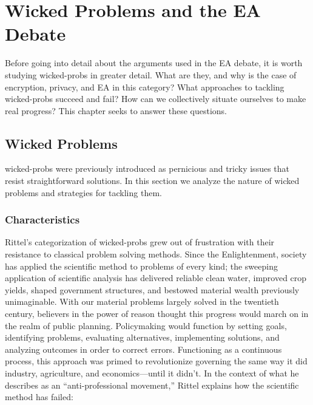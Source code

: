\chapter{Wicked Problems and the EA Debate}
\label{chap-arguments}

Before going into detail about the arguments used in the \ac{EA} debate, it is worth studying \acp{wicked-prob} in
greater detail. What are they, and why is the case of encryption, privacy, and \ac{EA} in this category? What approaches
to tackling \acp{wicked-prob} succeed and fail? How can we collectively situate ourselves to make real progress? This
chapter seeks to answer these questions.


\section{Wicked Problems}

\Acp{wicked-prob} were previously introduced as pernicious and tricky issues that resist straightforward solutions.
In this section we analyze the nature of wicked problems and strategies for tackling them.

\subsection{Characteristics}

Rittel's categorization of \acp{wicked-prob} grew out of frustration with their resistance to classical problem solving
methods. Since the Enlightenment, society has applied the scientific method to problems of every kind; the sweeping
application of scientific analysis has delivered reliable clean water, improved crop yields, shaped government
structures, and bestowed material wealth previously unimaginable. With our material problems largely solved in the
twentieth century, believers in the power of reason thought this progress would march on in the realm of public
planning. Policymaking would function by setting goals, identifying problems, evaluating alternatives, implementing
solutions, and analyzing outcomes in order to correct errors. Functioning as a continuous process, this approach was
primed to revolutionize governing the same way it did industry, agriculture, and economics---until it didn't. In the
context of what he describes as an ``anti-professional movement,'' Rittel explains how the scientific method has failed:

